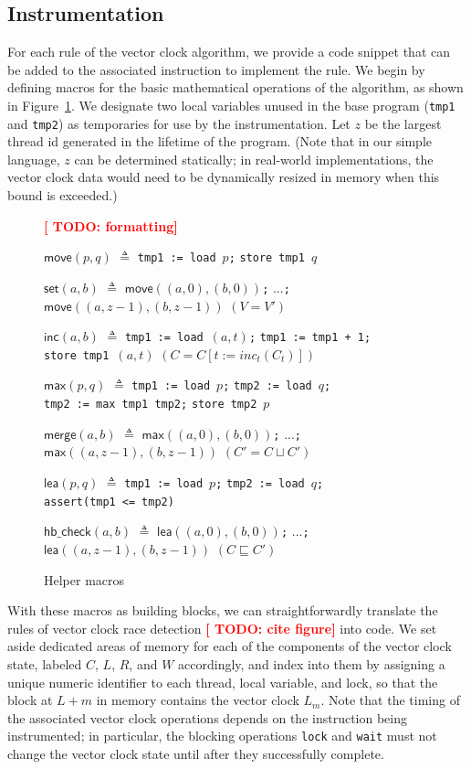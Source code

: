 \documentclass[preprint, 10pt]{sigplanconf}
\newcommand{\TODO}[1]{\textbf{\textcolor{red}{[ TODO: #1]}}}
\newcommand{\assign}[2]{#1\ \texttt{:=}\ #2}
\newcommand{\load}[2]{#1\ \texttt{:= load}\ #2}
\newcommand{\store}[2]{\texttt{store}\ #2\ #1}
\newcommand{\assert}[2]{\texttt{assert(}#1\ \texttt{<=}\ #2\texttt{)}}
\newcommand{\move}[2]{\ensuremath{\mathsf{move}(#1, #2)}}
\newcommand{\setvc}[2]{\ensuremath{\mathsf{set}(#1, #2)}}
\newcommand{\incvc}[2]{\ensuremath{\mathsf{inc}(#1, #2)}}
\newcommand{\maxa}[2]{\ensuremath{\mathsf{max}(#1, #2)}}
\newcommand{\maxvc}[2]{\ensuremath{\mathsf{merge}(#1, #2)}}
\newcommand{\lea}[2]{\ensuremath{\mathsf{lea}(#1, #2)}}
\newcommand{\vcle}[2]{\ensuremath{\mathsf{hb\_check}(#1, #2)}}
\begin{document}
\subsection{Instrumentation}
For each rule of the vector clock algorithm, we provide a code snippet that can be added to the associated instruction to implement the rule. We begin by defining macros for the basic mathematical operations of the algorithm, as shown in Figure~\ref{helper}. We designate two local variables unused in the base program (\texttt{tmp1} and \texttt{tmp2}) as temporaries for use by the instrumentation. Let $z$ be the largest thread id generated in the lifetime of the program. (Note that in our simple language, $z$ can be determined statically; in real-world implementations, the vector clock data would need to be dynamically resized in memory when this bound is exceeded.)

\begin{figure}[htb]
\TODO{formatting}

\move{p}{q} $\triangleq$ \load{\texttt{tmp1}}{$p$}\texttt{;} \store{$q$}{\texttt{tmp1}}

\setvc{a}{b} $\triangleq$ \move{(a, 0)}{(b, 0)}\texttt{;} ...\texttt{;} \move{(a, z - 1)}{(b, z - 1)}
$(V = V')$

\incvc{a}{b} $\triangleq$ \load{\texttt{tmp1}}{$(a, t)$}\texttt{;} \assign{\texttt{tmp1}}{\texttt{tmp1 + 1}}\texttt{;} \store{$(a, t)$}{\texttt{tmp1}}
$(C = C[t := \mathit{inc}_t(C_t)])$

\maxa{p}{q} $\triangleq$ \load{\texttt{tmp1}}{$p$}\texttt{;} \load{\texttt{tmp2}}{$q$}\texttt{;} \assign{\texttt{tmp2}}{\texttt{max\ tmp1\ tmp2}}\texttt{;} \store{$p$}{\texttt{tmp2}}

\maxvc{a}{b} $\triangleq$ \maxa{(a, 0)}{(b, 0)}\texttt{;} ...\texttt{;} \maxa{(a, z - 1)}{(b, z - 1)}
$(C' = C \sqcup C')$

\lea{p}{q} $\triangleq$ \load{\texttt{tmp1}}{$p$}\texttt{;} \load{\texttt{tmp2}}{$q$}\texttt{;} \assert{\texttt{tmp1}}{\texttt{tmp2}}

\vcle{a}{b} $\triangleq$ \lea{(a, 0)}{(b, 0)}\texttt{;} ...\texttt{;} \lea{(a, z - 1)}{(b, z - 1)}
$(C \sqsubseteq C')$
\caption{Helper macros}
\label{helper}
\end{figure}

With these macros as building blocks, we can straightforwardly translate the rules of vector clock race detection \TODO{cite figure} into code. We set aside dedicated areas of memory for each of the components of the vector clock state, labeled $C$, $L$, $R$, and $W$ accordingly, and index into them by assigning a unique numeric identifier to each thread, local variable, and lock, so that the block at $L + m$ in memory contains the vector clock $L_m$. Note that the timing of the associated vector clock operations depends on the instruction being instrumented; in particular, the blocking operations \texttt{lock} and \texttt{wait} must not change the vector clock state until after they successfully complete.
\end{document}
